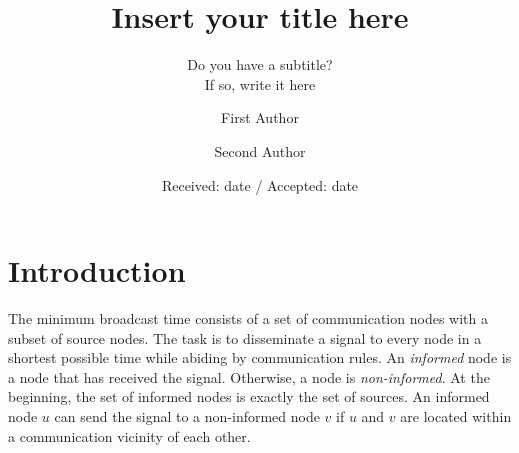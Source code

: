 \title{Insert your title here%
}
\subtitle{Do you have a subtitle?\\ If so, write it here}


\author{First Author         \and
        Second Author %
}



\date{Received: date / Accepted: date}


\maketitle

\begin{abstract}
\keywords{}
\end{abstract}

\section{Introduction}
\label{intro}
The minimum broadcast time consists of a set of communication nodes with a subset of source nodes. 
The task is to disseminate a signal to every node in a shortest possible time while abiding by communication rules.
An \emph{informed} node is a node that has received the signal.
Otherwise, a node is \emph{non-informed}.
At the beginning, the set of informed nodes is exactly the set of sources.
An informed node $u$ can send the signal to a non-informed node $v$ if $u$ and $v$ are located within a communication vicinity of each other.

